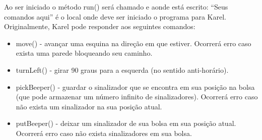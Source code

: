\documentclass[a4paper,11pt]{article}
\begin{document}
Ao ser iniciado o método run() será chamado e aonde está escrito: ``Seus comandos aqui'' é o local onde deve ser iniciado o programa para Karel. 
Originalmente, Karel pode responder aos seguintes comandos: \vspace{-1em}
\begin{itemize}
 \item move() - avançar uma esquina na direção em que estiver. Ocorrerá erro caso exista uma parede bloqueando seu caminho.
 \item turnLeft() - girar 90 graus para a esquerda (no sentido anti-horário).
 \item pickBeeper() - guardar o sinalizador que se encontra em sua posição na bolsa (que pode armazenar um número infinito de sinalizadores). Ocorrerá erro caso não exista um sinalizador na sua posição atual.
 \item putBeeper() - deixar um sinalizador de sua bolsa em sua posição atual. Ocorrerá erro caso não exista sinalizadores em sua bolsa.
\end{itemize} 
\end{document}
